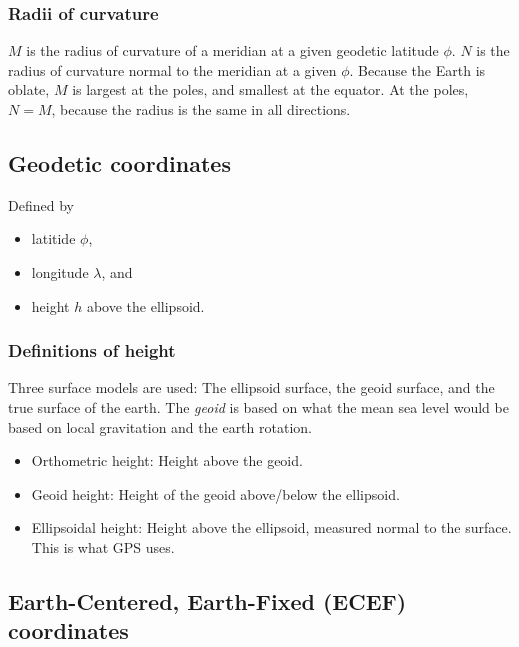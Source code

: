 \subsubsection{Radii of curvature}
$M$ is the radius of curvature of a meridian at a given geodetic latitude $\phi$. $N$ is the radius of curvature normal to the meridian at a given $\phi$. Because the Earth is oblate, $M$ is largest at the poles, and smallest at the equator. At the poles, $N = M$, because the radius is the same in all directions.

\subsection{Geodetic coordinates}

Defined by
\begin{itemize}
    \item latitide $\phi$,
    \item longitude $\lambda$, and
    \item height $h$ above the ellipsoid.
\end{itemize}

\subsubsection{Definitions of height}

Three surface models are used: The ellipsoid surface, the geoid surface, and the true surface of the earth. The \emph{geoid} is based on what the mean sea level would be based on local gravitation and the earth rotation.

\begin{itemize}
    \item Orthometric height: Height above the geoid.
    \item Geoid height: Height of the geoid above/below the ellipsoid.
    \item Ellipsoidal height: Height above the ellipsoid, measured normal to the surface. This is what GPS uses.
\end{itemize}

\subsection{Earth-Centered, Earth-Fixed (ECEF) coordinates}

